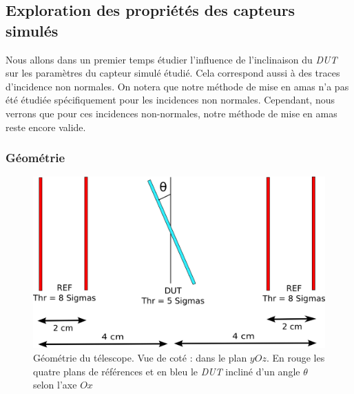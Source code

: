    \FloatBarrier
   
  
   \subsection{Exploration des propri\'et\'es des capteurs simul\'es}

   Nous allons dans un premier temps \'etudier l'influence de l'inclinaison du \textit{DUT} sur les param\`etres du capteur simul\'e \'etudi\'e. Cela correspond aussi \`a des traces d'incidence non normales. On notera que notre m\'ethode de mise en amas n'a pas \'et\'e \'etudi\'ee sp\'ecifiquement pour les incidences non normales. Cependant, nous verrons que pour ces incidences non-normales, notre m\'ethode de mise en amas reste encore valide.
   
   \FloatBarrier
   
   \subsubsection{G\'eom\'etrie}
 
   \begin{figure}[!hbt]
    \begin{center} 
     \includegraphics[scale=0.75]{./figures/config_5_plane_DUT_tilt.png}
     \caption{G\'eom\'etrie du t\'elescope. Vue de cot\'e : dans le plan $yOz$. En rouge les quatre plans de r\'ef\'erences et en bleu le \textit{DUT} inclin\'e d'un angle $\theta$ selon l'axe $Ox$}
    \label{fig:tel_tilt}
    \end{center}
   \end{figure} 
   
